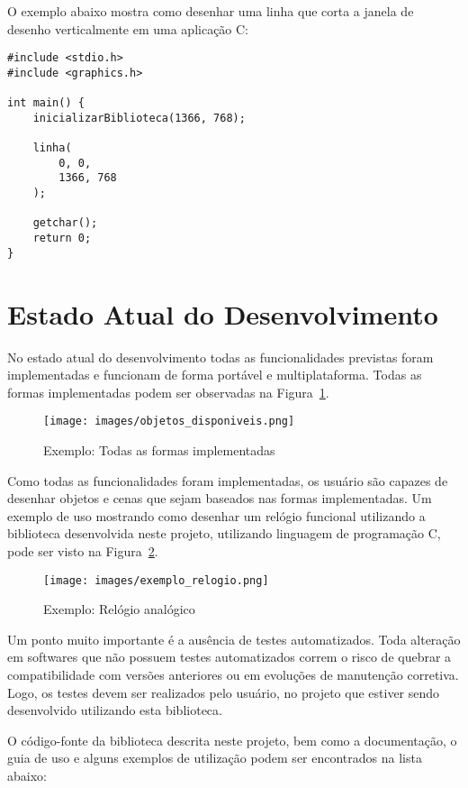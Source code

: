 \documentclass[12pt, %
openright,
oneside, %
a4paper,    %
brazil]{facom-ufu-abntex2}
\begin{document}
O exemplo abaixo mostra como desenhar uma linha que corta a janela de desenho verticalmente em uma aplicação C:

\begin{verbatim}
#include <stdio.h>
#include <graphics.h>

int main() {
    inicializarBiblioteca(1366, 768);

    linha(
        0, 0,
        1366, 768
    );

    getchar();
    return 0;
}
\end{verbatim}

\section{Estado Atual do Desenvolvimento}
No estado atual do desenvolvimento todas as funcionalidades previstas foram implementadas e funcionam de forma portável e multiplataforma. Todas as formas implementadas podem ser observadas na Figura~\ref{fig:todas_formas}.

\begin{figure}[htbp]
  \centering
  \texttt{[image: images/objetos\_disponiveis.png]}
  \caption{Exemplo: Todas as formas implementadas}
  \label{fig:todas_formas}
\end{figure}

Como todas as funcionalidades foram implementadas, os usuário são capazes de desenhar objetos e cenas que sejam baseados nas formas implementadas. Um exemplo de uso mostrando como desenhar um relógio funcional utilizando a biblioteca desenvolvida neste projeto, utilizando linguagem de programação C, pode ser visto na Figura~\ref{fig:exemplo_relogio}.

\begin{figure}[htbp]
  \centering
  \texttt{[image: images/exemplo\_relogio.png]}
  \caption{Exemplo: Relógio analógico}
  \label{fig:exemplo_relogio}
\end{figure}

Um ponto muito importante é a ausência de testes automatizados. Toda alteração em softwares que não possuem testes automatizados correm o risco de quebrar a compatibilidade com versões anteriores ou em evoluções de manutenção corretiva. Logo, os testes devem ser realizados pelo usuário, no projeto que estiver sendo desenvolvido utilizando esta biblioteca.

O código-fonte da biblioteca descrita neste projeto, bem como a documentação, o guia de uso e alguns exemplos de utilização podem ser encontrados na lista abaixo:
\end{document}

